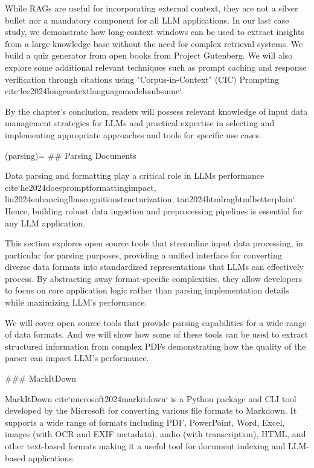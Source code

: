 While RAGs are useful for incorporating external context, they are not a silver bullet nor a mandatory component for all LLM applications. In our last case study, we demonstrate how long-context windows can be used to extract insights from a large knowledge base without the need for complex retrieval systems. We build a quiz generator from open books from Project Gutenberg. We will also explore some additional relevant techniques such as prompt caching and response verification through citations using "Corpus-in-Context" (CIC) Prompting {cite}`lee2024longcontextlanguagemodelssubsume`.

By the chapter's conclusion, readers will possess relevant knowledge of input data management strategies for LLMs and practical expertise in selecting and implementing appropriate approaches and tools for specific use cases.

(parsing)=
## Parsing Documents

Data parsing and formatting play a critical role in LLMs performance {cite}`he2024doespromptformattingimpact, liu2024enhancingllmscognitionstructurization, tan2024htmlraghtmlbetterplain`. Hence, building robust data ingestion and preprocessing pipelines is essential for any LLM application. 

This section explores open source tools that streamline input data processing, in particular for parsing purposes, providing a unified interface for converting diverse data formats into standardized representations that LLMs can effectively process. By abstracting away format-specific complexities, they allow developers to focus on core application logic rather than parsing implementation details while maximizing LLM's performance.

We will cover open source tools that provide parsing capabilities for a wide range of data formats. And we will show how some of these tools can be used to extract structured information from complex PDFs demonstrating how the quality of the parser can impact LLM's performance.

### MarkItDown

MarkItDown {cite}`microsoft2024markitdown` is a Python package and CLI tool developed by the Microsoft for converting various file formats to Markdown. It supports a wide range of formats including PDF, PowerPoint, Word, Excel, images (with OCR and EXIF metadata), audio (with transcription), HTML, and other text-based formats making it a useful tool for document indexing and LLM-based applications.

